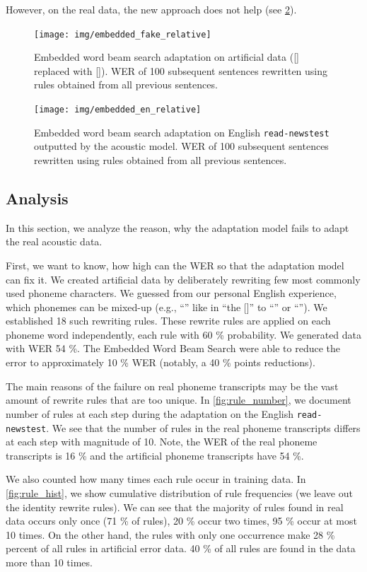 However, on the real data, the new approach does not help (see \cref{fig:embedded_en}). 

\begin{figure}[h]
	\texttt{[image: img/embedded\_fake\_relative]}
	\caption{Embedded word beam search  adaptation on artificial data ([] replaced with []). WER of 100 subsequent sentences rewritten using rules obtained from all previous sentences.}
	\label{fig:embedded} 
\end{figure}

\begin{figure}[h]
	\texttt{[image: img/embedded\_en\_relative]}
	\caption{Embedded word beam search adaptation on English \texttt{read-newstest} outputted by the acoustic model. WER of 100 subsequent sentences rewritten using rules obtained from all previous sentences.}
	\label{fig:embedded_en} 
\end{figure}


\subsection{Analysis}
In this section, we analyze the reason, why the adaptation model fails to adapt the real acoustic data.

First, we want to know, how high can the WER so that the adaptation model can fix it. We created artificial data by deliberately rewriting few most commonly used phoneme characters. We guessed from our personal English experience, which phonemes can be mixed-up (e.g., ``'' like in ``the []'' to ``'' or ``''). We established 18 such rewriting rules. These rewrite rules are applied on each phoneme word independently, each rule with 60 \% probability.  We generated data with WER 54 \%. The Embedded Word Beam Search were able to reduce the error to approximately 10 \% WER (notably, a 40 \% points reductions).  

The main reasons of the failure on real phoneme transcripts may be the vast amount of rewrite rules that are too unique. In \cref{fig:rule_number}, we document number of rules at each step during the adaptation on the English \texttt{read-newstest}. We see that the number of rules in the real phoneme transcripts differs at each step with magnitude of 10. Note, the WER of the real phoneme transcripts is 16 \% and the artificial phoneme transcripts have 54 \%.

We also counted how many times each rule occur in training data. In \cref{fig:rule_hist}, we show cumulative distribution of rule frequencies (we leave out the identity rewrite rules). We can see that the majority of rules found in real data occurs only once (71 \% of rules), 20 \% occur two times, 95 \% occur at most 10 times. On the other hand, the rules with only one occurrence make 28 \% percent of all rules in artificial error data. 40 \% of all rules are found in the data more than 10 times.

